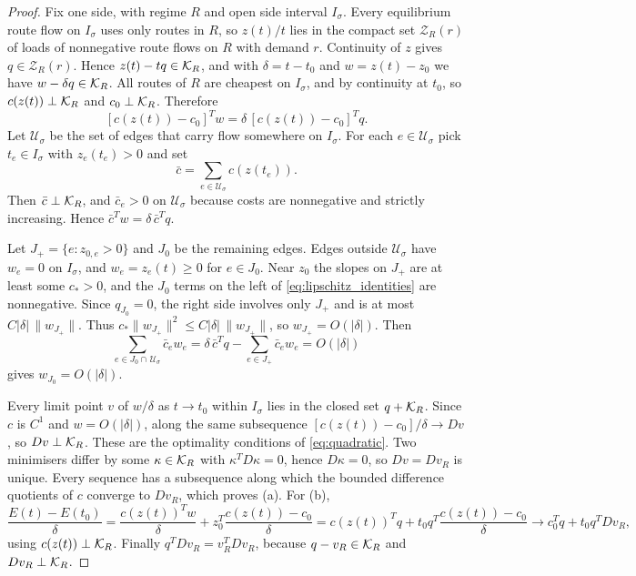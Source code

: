 \begin{proof}
Fix one side, with regime $R$ and open side interval $I_\sigma$. Every equilibrium route flow on $I_\sigma$ uses only routes in $R$, so $z(t)/t$ lies in the compact set $\mathcal Z_R(r)$ of loads of nonnegative route flows on $R$ with demand $r$. Continuity of $z$ gives $q\in\mathcal Z_R(r)$. Hence $z(t)-tq\in\mathcal K_R$, and with $\delta=t-t_0$ and $w=z(t)-z_0$ we have $w-\delta q\in\mathcal K_R$. All routes of $R$ are cheapest on $I_\sigma$, and by continuity at $t_0$, so $c(z(t))\perp\mathcal K_R$ and $c_0\perp\mathcal K_R$. Therefore
\begin{equation}\label{eq:lipschitz_identities}
 [c(z(t))-c_0]^Tw=\delta\,[c(z(t))-c_0]^Tq.
\end{equation}
Let $\mathcal U_\sigma$ be the set of edges that carry flow somewhere on $I_\sigma$. For each $e\in\mathcal U_\sigma$ pick $t_e\in I_\sigma$ with $z_e(t_e)>0$ and set
\begin{equation}\label{eq:sideannihilator}
 \bar c=\sum_{e\in\mathcal U_\sigma}c(z(t_e)).
\end{equation}
Then $\bar c\perp\mathcal K_R$, and $\bar c_e>0$ on $\mathcal U_\sigma$ because costs are nonnegative and strictly increasing. Hence $\bar c^Tw=\delta\,\bar c^Tq$.

Let $J_+=\{e:z_{0,e}>0\}$ and $J_0$ be the remaining edges. Edges outside $\mathcal U_\sigma$ have $w_e=0$ on $I_\sigma$, and $w_e=z_e(t)\ge0$ for $e\in J_0$. Near $z_0$ the slopes on $J_+$ are at least some $c_*>0$, and the $J_0$ terms on the left of \eqref{eq:lipschitz_identities} are nonnegative. Since $q_{J_0}=0$, the right side involves only $J_+$ and is at most $C|\delta|\,\|w_{J_+}\|$. Thus $c_*\|w_{J_+}\|^2\le C|\delta|\,\|w_{J_+}\|$, so $w_{J_+}=O(|\delta|)$. Then
\[
 \sum_{e\in J_0\cap\,\mathcal U_\sigma}\bar c_ew_e=\delta\,\bar c^Tq-\sum_{e\in J_+}\bar c_ew_e=O(|\delta|)
\]
gives $w_{J_0}=O(|\delta|)$.

Every limit point $v$ of $w/\delta$ as $t\to t_0$ within $I_\sigma$ lies in the closed set $q+\mathcal K_R$. Since $c$ is $C^1$ and $w=O(|\delta|)$, along the same subsequence $[c(z(t))-c_0]/\delta\to Dv$, so $Dv\perp\mathcal K_R$. These are the optimality conditions of \eqref{eq:quadratic}. Two minimisers differ by some $\kappa\in\mathcal K_R$ with $\kappa^TD\kappa=0$, hence $D\kappa=0$, so $Dv=Dv_R$ is unique. Every sequence has a subsequence along which the bounded difference quotients of $c$ converge to $Dv_R$, which proves (a). For (b),
\[
 \frac{E(t)-E(t_0)}{\delta}=\frac{c(z(t))^Tw}{\delta}+z_0^T\frac{c(z(t))-c_0}{\delta}
 =c(z(t))^Tq+t_0q^T\frac{c(z(t))-c_0}{\delta}\longrightarrow c_0^Tq+t_0q^TDv_R,
\]
using $c(z(t))\perp\mathcal K_R$. Finally $q^TDv_R=v_R^TDv_R$, because $q-v_R\in\mathcal K_R$ and $Dv_R\perp\mathcal K_R$.


\end{proof}
